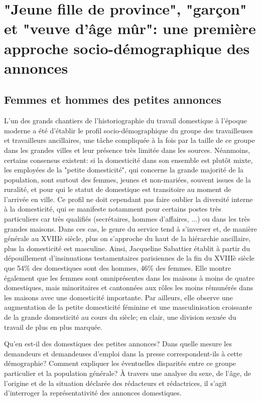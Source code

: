 \part{"Jeune fille de province", "garçon" et "veuve d'âge mûr": une première approche socio-démographique des annonces}



\chapter{Femmes et hommes des petites annonces}

L'un des grands chantiers de l'historiographie du travail domestique à l'époque moderne a été d'établir le profil socio-démographique du groupe des travailleuses et travailleurs ancillaires, une tâche compliquée à la fois par la taille de ce groupe dans les grandes villes et leur présence très limitée dans les sources. Néanmoins, certains consensus existent: si la domesticité dans son ensemble est plutôt mixte, les employées de la "petite domesticité", qui concerne la grande majorité de la population, sont surtout des femmes, jeunes et non-mariées, souvent issues de la ruralité, et pour qui le statut de domestique est transitoire au moment de l'arrivée en ville. Ce profil ne doit cependant pas faire oublier la diversité interne à la domesticité, qui se manifeste notamment pour certains postes très particuliers car très qualifiés (secrétaires, hommes d'affaires, ...) ou dans les très grandes maisons. Dans ces cas, le genre du service tend à s'inverser et, de manière générale au XVIIIè siècle, plus on s'approche du haut de la hiérarchie ancillaire, plus la domesticité est masculine. Ainsi, Jacqueline Sabattier établit à partir du dépouillement d'insinuations testamentaires parisiennes de la fin du XVIIIè siècle que 54\% des domestiques sont des hommes, 46\% des femmes. Elle montre également que les femmes sont omniprésentes dans les maisons à moins de quatre domestiques, mais minoritaires et cantonnées aux rôles les moins rémunérés dans les maisons avec une domesticité importante. Par ailleurs, elle observe une augmentation de la petite domesticité féminine et une masculinisation croissante de la grande domesticité au cours du siècle; en clair, une division sexuée du travail de plus en plus marquée.

Qu'en est-il des domestiques des petites annonces? Dans quelle mesure les demandeurs et demandeuses d'emploi dans la presse correspondent-ils à cette démographie? Comment expliquer les éventuelles disparités entre ce groupe particulier et la population générale? À travers une analyse du sexe, de l'âge, de l'origine et de la situation déclarée des rédacteurs et rédactrices, il s'agit d'interroger la représentativité des annonces domestiques. 


